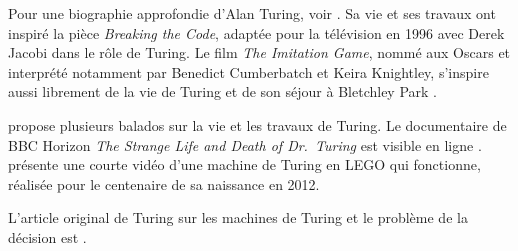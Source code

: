\documentclass[../../../include/open-logic-section]{subfiles}
\begin{document}
\begin{reading}
Pour une biographie approfondie d'Alan Turing, voir
\citet{Hodges2014}. Sa vie et ses travaux ont inspiré la pièce
\emph{Breaking the Code}, adaptée pour la télévision en 1996 avec
Derek Jacobi dans le rôle de Turing. Le film \emph{The Imitation
Game}, nommé aux Oscars et interprété notamment par Benedict
Cumberbatch et Keira Knightley,
s'inspire aussi librement de la vie de Turing et de son séjour à
Bletchley Park \citep{Imitation2014}.

\citet{Radiolab2012} propose plusieurs balados sur la vie et les
travaux de Turing. Le documentaire de BBC Horizon
\emph{The Strange Life and Death of Dr.~Turing} est visible en ligne
\citep{Sykes1992}. \citep{Theelen2012} présente une courte vidéo
d'une machine de Turing en LEGO qui fonctionne, réalisée pour le
centenaire de sa naissance en 2012.

L'article original de Turing sur les machines de Turing et le
problème de la décision est \citet{Turing1937}.
\end{reading}
\end{document}
